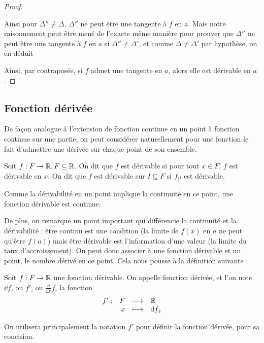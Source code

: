 \begin{proof}
\begin{itemize}[label=$\bullet$]
        Ainsi pour $\Delta'' \neq \Delta$, $\Delta''$ ne peut être une tangente à $f$ en $a$. Mais notre raisonnement peut être mené de l'exacte même manière pour prouver que $\Delta''$ ne peut être une tangente à $f$ en $a$ si $\Delta''\neq \Delta'$, et comme $\Delta \neq \Delta'$ par hypothèse, on en déduit 
    \end{itemize}

    Ainsi, par contraposée, si $f$ admet une tangente en $a$, alors elle est dérivable en $a$.
 \end{proof}

 \subsection{Fonction dérivée}

 De façon analogue à l'extension de fonction continue en un point à fonction continue sur une partie, on peut considérer naturellement pour une fonction le fait d'admettre une dérivée sur chaque point de son ensemble.

 \begin{defi}[Dérivabilité]
     Soit $f : F\to\mathbb{R},F\subseteq \mathbb{R}$. On dit que $f$ est dérivable si pour tout $x\in F$, $f$ est dérivable en $x$. On dit que $f$ est dérivable sur $I\subseteq F$ si $f_{|I}$ est dérivable.
 \end{defi}

 \begin{rmk}
     Comme la dérivabilité en un point implique la continuité en ce point, une fonction dérivable est continue.
 \end{rmk}

 De plus, on remarque un point important qui différencie la continuité et la dérivabilité : être continu est une condition (la limite de $f(x)$ en $a$ ne peut qu'être $f(a)$) mais être dérivable est l'information d'une valeur (la limite du taux d'accroissement). On peut donc associer à une fonction dérivable et un point, le nombre dérivé en ce point. Cela nous pousse à la définition suivante :

 \begin{defi}
     Soit $f : F \to\mathbb{R}$ une fonction dérivable. On appelle fonction dérivée, et l'on note $\dd f$, ou $f'$, ou $\displaystyle{\frac{\dd}{\dd x}}f$, la fonction $$\begin{array}[t]{lrcl} f': & F & \longrightarrow & \mathbb{R} \\ & x & \longmapsto & \mathrm{d} f_x \end{array}$$ 

     On utilisera principalement la notation $f'$ pour définir la fonction dérivée, pour sa concision.
 \end{defi}


